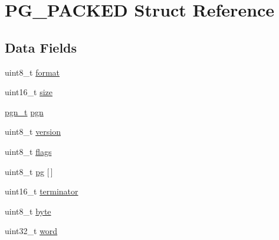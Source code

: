 \hypertarget{structPG__PACKED}{\section{P\+G\+\_\+\+P\+A\+C\+K\+E\+D Struct Reference}
\label{structPG__PACKED}
}
\subsection*{Data Fields}
\begin{DoxyCompactItemize}
\item 
uint8\+\_\+t \hyperlink{structPG__PACKED_a876992183d1a49c356db499398d7e12b}{format}
\item 
uint16\+\_\+t \hyperlink{structPG__PACKED_a54f90d2a7f3575e4a8747aa895a029b1}{size}
\item 
\hyperlink{parameter__group_8h_ae7ed3d45ee3ac53fa92a8df996ff5f97}{pgn\+\_\+t} \hyperlink{structPG__PACKED_ac7675059c534ab6df91fa2e0c9d91dd8}{pgn}
\item 
uint8\+\_\+t \hyperlink{structPG__PACKED_ab3b61517b84238983be864b18ae81d62}{version}
\item 
uint8\+\_\+t \hyperlink{structPG__PACKED_a72dfa40583527f71f57de5003c24a757}{flags}
\item 
uint8\+\_\+t \hyperlink{structPG__PACKED_aaeed263c3a2e09c06b1c7eef6b1bb921}{pg} \mbox{[}$\,$\mbox{]}
\item 
uint16\+\_\+t \hyperlink{structPG__PACKED_a98ef29ee25199fca207a59246a1de6e9}{terminator}
\item 
uint8\+\_\+t \hyperlink{structPG__PACKED_a1223c9ded33fdda5f748832dcf0494ca}{byte}
\item 
uint32\+\_\+t \hyperlink{structPG__PACKED_acbc1fc975256148dcadcb10057faf27a}{word}
\end{DoxyCompactItemize}


